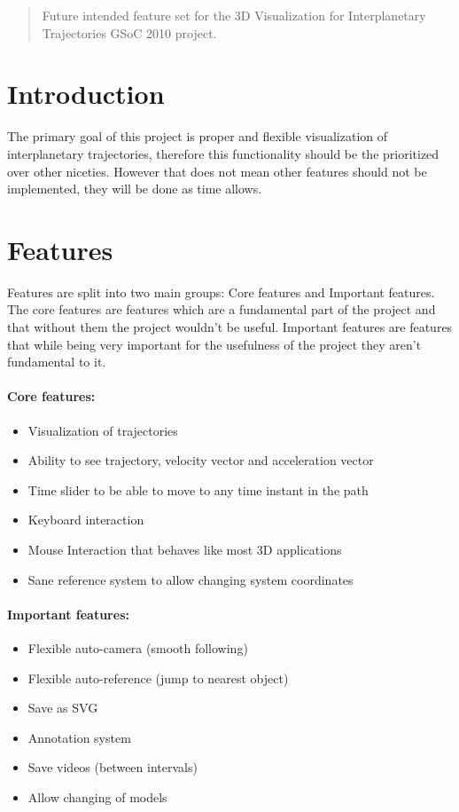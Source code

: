 \documentclass[12pt]{article}
\begin{document}
\maketitle

\begin{abstract}
Future intended feature set for the 3D Visualization for Interplanetary Trajectories GSoC 2010 project.
\end{abstract}

\section{Introduction}
The primary goal of this project is proper and flexible visualization of interplanetary trajectories, therefore this functionality should be the prioritized over other niceties. However that does not mean other features should not be implemented, they will be done as time allows.

\section{Features}

Features are split into two main groups: Core features and Important features. The core features are features which are a fundamental part of the project and that without them the project wouldn't be useful. Important features are features that while being very important for the usefulness of the project they aren't fundamental to it.

\paragraph{Core features:}
\begin{itemize}
\item Visualization of trajectories
\item Ability to see trajectory, velocity vector and acceleration vector
\item Time slider to be able to move to any time instant in the path
\item Keyboard interaction
\item Mouse Interaction that behaves like most 3D applications
\item Sane reference system to allow changing system coordinates
\end{itemize}

\paragraph{Important features:}
\begin{itemize}
\item Flexible auto-camera (smooth following)
\item Flexible auto-reference (jump to nearest object)
\item Save as SVG
\item Annotation system
\item Save videos (between intervals)
\item Allow changing of models
\end{itemize}
\end{document}

